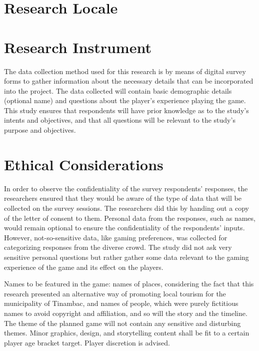 \documentclass{research}
\begin{document}
\section{Research Locale}


\section{Research Instrument}

The data collection method used for this research is by means of digital survey forms
to gather information about the necessary details that can be incorporated into the
project. The data collected will contain basic demographic details (optional name) and
questions about the player's experience playing the game. This study ensures that
respondents will have prior knowledge as to the study's intents and objectives, and
that all questions will be relevant to the study's purpose and objectives.

\section{Ethical Considerations}

In order to observe the confidentiality of the survey respondents' responses, the
researchers ensured that they would be aware of the type of data that will be collected
on the survey sessions. The researchers did this by handing out a copy of the letter of
consent to them. Personal data from the responses, such as names, would remain optional
to ensure the confidentiality of the respondents' inputs. However, not-so-sensitive
data, like gaming preferences, was collected for categorizing responses from the diverse
crowd. The study did not ask very sensitive personal questions but rather gather some
data relevant to the gaming experience of the game and its effect on the players.

Names to be featured in the game: names of places, considering the fact that this
research presented an alternative way of promoting local tourism for the municipality of
Tinambac, and names of people, which were purely fictitious names to avoid copyright
and affiliation, and so will the story and the timeline. The theme of the planned game
will not contain any sensitive and disturbing themes. Minor graphics, design, and
storytelling content shall be fit to a certain player age bracket target. Player
discretion is advised.
\end{document}
